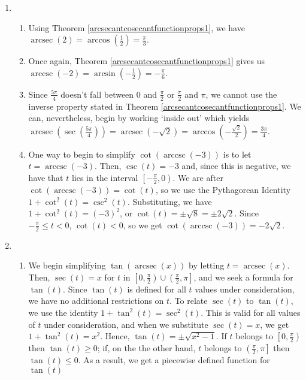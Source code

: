 {
\begin{enumerate}

\item

\begin{enumerate}

\item Using Theorem \ref{arcsecantcosecantfunctionprops1}, we have $\operatorname{arcsec}(2) = \arccos\left(\frac{1}{2}\right) = \frac{\pi}{3}$.

\item  Once again, Theorem \ref{arcsecantcosecantfunctionprops1} gives us $\operatorname{arccsc}(-2) = \arcsin\left(-\frac{1}{2}\right) = -\frac{\pi}{6}$.


\item  Since $\frac{5\pi}{4}$ doesn't fall between $0$ and $\frac{\pi}{2}$ or $\frac{\pi}{2}$ and $\pi$, we cannot use the inverse property stated in Theorem \ref{arcsecantcosecantfunctionprops1}.  We can, nevertheless, begin by working `inside out' which yields  $\operatorname{arcsec}\left( \sec\left( \frac{5\pi}{4} \right) \right) = \operatorname{arcsec}(-\sqrt{2}) = \arccos\left(-\frac{\sqrt{2}}{2}\right) = \frac{3\pi}{4}$.

\item   One way to begin to simplify $\cot\left(\operatorname{arccsc}\left(-3\right)\right)$ is to let $t = \operatorname{arccsc}(-3)$.  Then,  $\csc(t) = -3$ and, since this is negative, we have that $t$ lies in the interval  $\left[ -\frac{\pi}{2},0\right)$.  We are after $\cot\left(\operatorname{arccsc}\left(-3\right)\right) = \cot(t)$, so we use the Pythagorean Identity $1 + \cot^{2}(t) = \csc^{2}(t)$.  Substituting, we have $1 + \cot^{2}(t) = (-3)^2$, or $\cot(t) = \pm \sqrt{8} = \pm 2 \sqrt{2}$.  Since $-\frac{\pi}{2} \leq t < 0$, $\cot(t) < 0$, so we get  $\cot\left(\operatorname{arccsc}\left(-3\right)\right) = -2\sqrt{2}$.

\end{enumerate}

\item 

\begin{enumerate}


\item  We begin simplifying  $\tan(\operatorname{arcsec}(x))$ by letting $t = \operatorname{arcsec}(x)$.  Then, $\sec(t) = x$ for $t$ in $\left[0, \frac{\pi}{2}\right) \cup \left(\frac{\pi}{2}, \pi \right]$, and we seek a formula for $\tan(t)$.  Since $\tan(t)$ is defined for all $t$ values under consideration, we have no additional restrictions on $t$.  To relate $\sec(t)$ to $\tan(t)$, we use the identity $1 + \tan^{2}(t) = \sec^{2}(t)$.  This is valid for all values of $t$ under consideration, and when we substitute $\sec(t) = x$, we get $1 + \tan^{2}(t) = x^2$.  Hence, $\tan(t) = \pm \sqrt{x^2-1}$.  If $t$ belongs to $\left[0, \frac{\pi}{2}\right)$ then $\tan(t) \geq 0$;  if, on the the other hand, $t$ belongs to  $\left(\frac{\pi}{2}, \pi \right]$ then $\tan(t) \leq 0$. As a result, we get a piecewise defined function for $\tan(t)$


\end{enumerate}
\end{enumerate}}
